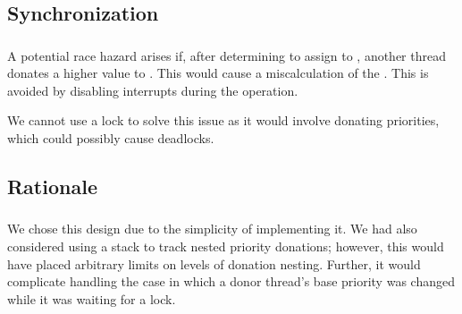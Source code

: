 \subsection{Synchronization}
	\subsubsection{}
		A potential race hazard arises if, after determining to assign \bpr to , another thread donates a higher value to . This would cause a miscalculation of the . This is avoided by disabling interrupts during the  operation.
		
		We cannot use a lock to solve this issue as it would involve donating priorities, which could possibly cause deadlocks.
\subsection{Rationale}
	\subsubsection{}
		We chose this design due to the simplicity of implementing it. We had also considered using a stack to track nested priority donations; however, this would have placed arbitrary limits on levels of donation nesting. Further, it would complicate handling the case in which a donor thread's base priority was changed while it was waiting for a lock.